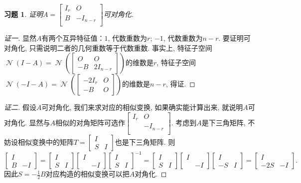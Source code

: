 \documentclass{ctexart}
\newtheorem{exercise}[thm]{习题}
\def\zero{O}
\DeclareMathOperator{\nullspace}{\mathcal{N}}
\begin{document}
\begin{exercise}
证明$A=\begin{bmatrix}
I_r & \zero \\ B & -I_{n-r} \\
\end{bmatrix}$可对角化. 
\end{exercise}
\begin{proof}[证一]
	显然$A$有两个互异特征值：$1$, 代数重数为$r$; $-1$, 代数重数为$n-r$. 
	要证明可对角化, 只需说明二者的几何重数等于代数重数. 事实上, 特征子空间$\nullspace(I-A)=\nullspace\left( \begin{bmatrix}
			\zero & \zero \\ -B & 2I_{n-r}
	\end{bmatrix} \right)$的维数是$r$, 特征子空间$\nullspace(-I-A)=\nullspace\left( \begin{bmatrix}
			-2I_r & \zero \\ -B & \zero
	\end{bmatrix} \right)$的维数是$n-r$, 得证. 
\end{proof}
\begin{proof}[证二]
	假设$A$可对角化, 我们来求对应的相似变换, 如果确实能计算出来, 就说明$A$可对角化. 显然与$A$相似的对角矩阵可选作$\begin{bmatrix}
I_r & \zero \\  & -I_{n-r} \\
	\end{bmatrix} $. 
	考虑到$A$是下三角矩阵, 不妨设相似变换中的矩阵$T=\begin{bmatrix}
		I & \\ S & I
	\end{bmatrix}$也是下三角矩阵. 则
	\[
		\begin{bmatrix}
	I & \\ B & -I
	\end{bmatrix}=\begin{bmatrix}
	I & \\ S & I
	\end{bmatrix}\begin{bmatrix}
		 I & \\ & -I 
	\end{bmatrix}\begin{bmatrix}
		 I & \\ S & I
	 \end{bmatrix}^{-1}=\begin{bmatrix}
	I & \\ S & I
	\end{bmatrix}\begin{bmatrix}
		 I & \\ & -I 
	\end{bmatrix}\begin{bmatrix}
		 I & \\ -S & I
	 \end{bmatrix}=\begin{bmatrix}
	 I & \\ -2S & -I
	 \end{bmatrix}.
	\]因此$S=-\frac{1}{2}B$对应构造的相似变换可以把$A$对角化. 
\end{proof}
\end{document}
